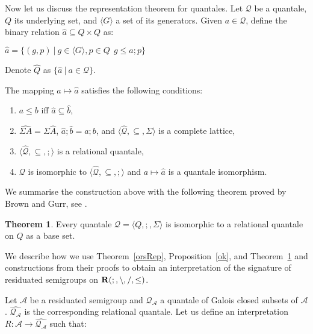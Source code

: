 \documentclass[a4paper]{article}
\theoremstyle{definition}
\theoremstyle{theorem}
\newtheorem{theorem}{Theorem}
\theoremstyle{proposition}
\theoremstyle{lemma}
\theoremstyle{ex}
\theoremstyle{corollary}
\theoremstyle{claim}
\begin{document}
Now let us discuss the representation theorem for quantales. Let $\mathcal{Q}$ be a quantale, $Q$ its underlying set, and $\langle G \rangle$ a set of its generators. Given $a \in \mathcal{Q}$, define the binary relation $\hat{a} \subseteq Q \times Q$ as:

\begin{center}
  $\hat{a} = \{ (g,p) \: | \: g \in \langle G \rangle, p \in Q \:\: g \leq a ; p \}$
\end{center}
Denote $\widehat{Q}$ as $\{ \hat{a} \: | \: a \in \mathcal{Q} \}$.

The mapping $a \mapsto \hat{a}$ satisfies the following conditions:

\begin{enumerate}
\item $a \leq b$ iff $\hat{a} \subseteq \hat{b}$,

\item $\widehat{\Sigma A} = \Sigma \widehat{A}$, $\hat{a} ; \hat{b} = \widehat{a ; b}$, and $\langle \widehat{\mathcal{Q}}, \subseteq, \Sigma \rangle$ is a complete lattice,

\item $\langle \widehat{\mathcal{Q}}, \subseteq, ; \rangle$ is a relational quantale,

\item $\mathcal{Q}$ is isomorphic to $\langle \widehat{\mathcal{Q}}, \subseteq, ; \rangle$ and $a \mapsto \hat{a}$ is a quantale isomorphism.
\end{enumerate}

We summarise the construction above with the following theorem proved by Brown and Gurr, see \cite[Theorem 3.11]{brown1993representation}.

\begin{theorem} \label{quantaleRep}
  Every quantale $\mathcal{Q} = \langle Q, ;, \Sigma \rangle$ is isomorphic to a relational quantale on $Q$ as a base set.
\end{theorem}

We describe how we use Theorem~\ref{orsRep}, Proposition~\ref{ok}, and Theorem~\ref{quantaleRep} and constructions from their proofs to obtain an interpretation of the signature of residuated semigroups on ${\bf R}(;, \setminus, /, \leq)$.

Let $\mathcal{A}$ be a residuated semigroup and $\mathcal{Q}_{\mathcal{A}}$ a quantale of Galois closed subsets of $\mathcal{A}$. $\widehat{\mathcal{Q}_{\mathcal{A}}}$ is the corresponding relational quantale. Let us define an interpretation $R : \mathcal{A} \to \widehat{\mathcal{Q}_{\mathcal{A}}}$ such that:
\end{document}
